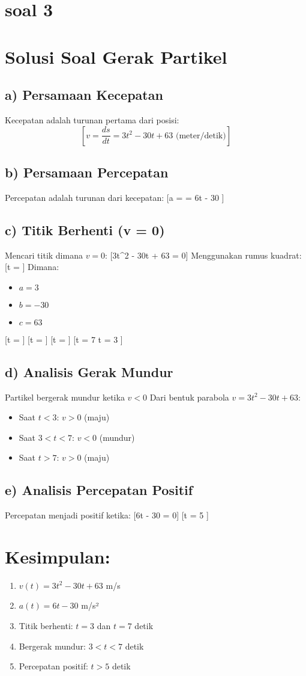 \documentclass{article}
\begin{document}
\section{ soal 3}
\section*{Solusi Soal Gerak Partikel}
\subsection*{a) Persamaan Kecepatan}
Kecepatan adalah turunan pertama dari posisi:
$$[v = \frac{ds}{dt} = 3t^2 - 30t + 63 \text{ (meter/detik)}]$$
\subsection*{b) Persamaan Percepatan}
Percepatan adalah turunan dari kecepatan:
[a =  = 6t - 30 ]
\subsection*{c) Titik Berhenti (v = 0)}
Mencari titik dimana $v = 0$:
[3t^2 - 30t + 63 = 0]
Menggunakan rumus kuadrat:
[t = ]
Dimana:
\begin{itemize}
\item $a = 3$
\item $b = -30$
\item $c = 63$
\end{itemize}
[t = ]
[t = ]
[t = ]
[t = 7  t = 3 ]
\subsection*{d) Analisis Gerak Mundur}
Partikel bergerak mundur ketika $v < 0$
Dari bentuk parabola $v = 3t^2 - 30t + 63$:
\begin{itemize}
\item Saat $t < 3$: $v > 0$ (maju)
\item Saat $3 < t < 7$: $v < 0$ (mundur)
\item Saat $t > 7$: $v > 0$ (maju)
\end{itemize}
\subsection*{e) Analisis Percepatan Positif}
Percepatan menjadi positif ketika:
[6t - 30 = 0]
[t = 5 ]
\section*{Kesimpulan:}
\begin{enumerate}
\item $v(t) = 3t^2 - 30t + 63$ m/s
\item $a(t) = 6t - 30$ m/s²
\item Titik berhenti: $t = 3$ dan $t = 7$ detik
\item Bergerak mundur: $3 < t < 7$ detik
\item Percepatan positif: $t > 5$ detik
\end{enumerate}
\end{document}
